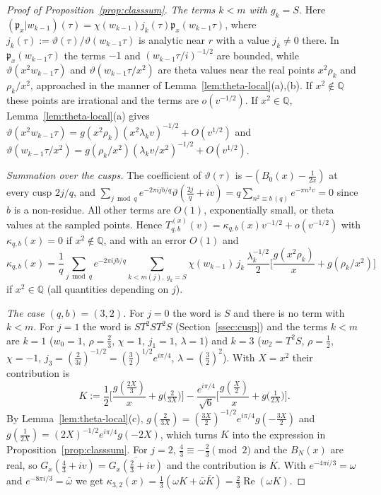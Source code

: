 \documentclass[11pt]{amsart}
\newcommand{\QQ}{\mathbb Q}
\renewcommand{\Re}{\operatorname{Re}}
\theoremstyle{definition}
\theoremstyle{remark}
\numberwithin{equation}{section}
\begin{document}
\begin{proof}[Proof of Proposition~\textup{\ref{prop:classsum}}]
\emph{The terms $k<m$ with $g_k=S$.} Here $(\mathfrak p_x|w_{k-1})(\tau)=\chi(w_{k-1})j_k(\tau)\mathfrak p_x(w_{k-1}\tau)$, where
$j_k(\tau):=\vartheta(\tau)/\vartheta(w_{k-1}\tau)$ is analytic near $r$ with a value $j_k\ne0$ there. In $\mathfrak p_x(w_{k-1}\tau)$ the terms $-1$
and $(w_{k-1}\tau/i)^{-1/2}$ are bounded, while $\vartheta(x^2w_{k-1}\tau)$ and $\vartheta(w_{k-1}\tau/x^2)$ are theta values near the real points
$x^2\rho_k$ and $\rho_k/x^2$, approached in the manner of Lemma~\ref{lem:theta-local}(a),(b). If $x^2\notin\QQ$ these points are irrational and
the terms are $o(v^{-1/2})$. If $x^2\in\QQ$, Lemma~\ref{lem:theta-local}(a) gives
$\vartheta(x^2w_{k-1}\tau)=g(x^2\rho_k)(x^2\lambda_kv)^{-1/2}+O(v^{1/2})$ and $\vartheta(w_{k-1}\tau/x^2)=g(\rho_k/x^2)(\lambda_kv/x^2)^{-1/2}+O(v^{1/2})$.

\emph{Summation over the cusps.} The coefficient of $\vartheta(\tau)$ is $-(B_0(x)-\frac1{2x})$ at every cusp $2j/q$, and
$\sum_{j\bmod q}e^{-2\pi ijb/q}\vartheta(\frac{2j}q+iv)=q\sum_{n^2\equiv b\,(q)}e^{-\pi n^2v}=0$ since $b$ is a non-residue. All other terms are $O(1)$,
exponentially small, or theta values at the sampled points. Hence $T^{(x)}_{q,b}(v)=\kappa_{q,b}(x)v^{-1/2}+o(v^{-1/2})$ with $\kappa_{q,b}(x)=0$ if
$x^2\notin\QQ$, and with an error $O(1)$ and
\begin{equation}\label{eq:kappa-general}
\kappa_{q,b}(x)=\frac1q\sum_{j\bmod q}e^{-2\pi ijb/q}\sum_{k<m(j),\ g_k=S}\chi(w_{k-1})\,j_k\,\frac{\lambda_k^{-1/2}}2\Big[\frac{g(x^2\rho_k)}x+g(\rho_k/x^2)\Big]
\end{equation}
if $x^2\in\QQ$ (all quantities depending on $j$).

\emph{The case $(q,b)=(3,2)$.} For $j=0$ the word is $S$ and there is no term with $k<m$. For $j=1$ the word is $ST^2ST^2S$
(Section~\ref{ssec:cusp}) and the terms $k<m$ are $k=1$ ($w_0=1$, $\rho=\frac23$, $\chi=1$, $j_1=1$, $\lambda=1$) and $k=3$ ($w_2=T^2S$,
$\rho=\frac12$, $\chi=-1$, $j_3=(\frac2{3i})^{-1/2}=(\frac32)^{1/2}e^{i\pi/4}$, $\lambda=(\frac32)^2$). With $X=x^2$ their contribution is
\[
K:=\frac12\Big[\frac{g(\frac{2X}3)}x+g\big(\tfrac2{3X}\big)\Big]-\frac{e^{i\pi/4}}{\sqrt6}\Big[\frac{g(\frac X2)}x+g\big(\tfrac1{2X}\big)\Big].
\]
By Lemma~\ref{lem:theta-local}(c), $g(\frac2{3X})=(\frac{3X}2)^{-1/2}e^{i\pi/4}g(-\frac{3X}2)$ and $g(\frac1{2X})=(2X)^{-1/2}e^{i\pi/4}g(-2X)$, which turns $K$
into the expression in Proposition~\ref{prop:classsum}. For $j=2$, $\frac43\equiv-\frac23\pmod2$ and the $B_N(x)$ are real, so
$G_x(\frac43+iv)=\overline{G_x(\frac23+iv)}$ and the contribution is $\overline K$. With $e^{-4\pi i/3}=\omega$ and $e^{-8\pi i/3}=\bar\omega$ we get
$\kappa_{3,2}(x)=\frac13(\omega K+\bar\omega\overline K)=\frac23\Re(\omega K)$.


\end{proof}
\end{document}
